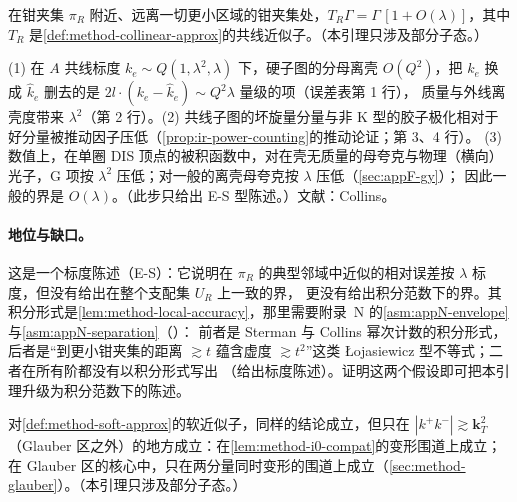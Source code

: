 \begin{lemma}\label{lem:method-collinear-accuracy}
在钳夹集 $\pi_R$ 附近、远离一切更小区域的钳夹集处，$T_R\Gamma=\Gamma\,[1+O(\lambda)]$，其中 $T_R$ 是\cref{def:method-collinear-approx}的共线近似子。（本引理只涉及部分子态。）
\end{lemma}

\begin{proofsketch}
(1) 在 $A$ 共线标度 $k_e\sim Q(1,\lambda^2,\lambda)$ 下，硬子图的分母离壳 $O(Q^2)$，把 $k_e$ 换成 $\hat k_e$ 删去的是 $2l\cdot(k_e-\hat k_e)\sim Q^2\lambda$ 量级的项（误差表第 1 行），
质量与外线离壳度带来 $\lambda^2$（第 2 行）。(2) 共线子图的坏旋量分量与非 K 型的胶子极化相对于好分量被推动因子压低（\cref{prop:ir-power-counting}的推动论证；第 3、4 行）。
(3) 数值上，在单圈 DIS 顶点的被积函数中，对在壳无质量的母夸克与物理（横向）光子，G 项按 $\lambda^2$ 压低；对一般的离壳母夸克按 $\lambda$ 压低（\cref{sec:appF-gy}）；
因此一般的界是 $O(\lambda)$。（此步只给出 E-S 型陈述。）文献：Collins\cite[第~10~章（Sudakov 形状因子）与第~11.3~节]{Collins2011}。
\end{proofsketch}

\paragraph{地位与缺口。}这是一个标度陈述（E-S）：它说明在 $\pi_R$ 的典型邻域中近似的相对误差按 $\lambda$ 标度，但没有给出在整个支配集 $U_R$ 上一致的界，
更没有给出积分范数下的界。其积分形式是\cref{lem:method-local-accuracy}，那里需要附录~N 的\cref{asm:appN-envelope}与\cref{asm:appN-separation}（\tagA）：
前者是 Sterman 与 Collins 幂次计数的积分形式，后者是“到更小钳夹集的距离 $\gtrsim t$ 蕴含虚度 $\gtrsim t^2$”这类 Łojasiewicz 型不等式；二者在所有阶都没有以积分形式写出
（\cite[第~5~章]{Collins2011}给出标度陈述）。证明这两个假设即可把本引理升级为积分范数下的陈述。

\begin{lemma}\label{lem:method-soft-accuracy}
对\cref{def:method-soft-approx}的软近似子，同样的结论成立，但只在 $|k^+k^-|\gtrsim\mathbf k_T^2$（Glauber 区之外）的地方成立：在\cref{lem:method-i0-compat}的变形围道上成立；
在 Glauber 区的核心中，只在两分量同时变形的围道上成立（\cref{sec:method-glauber}）。（本引理只涉及部分子态。）
\end{lemma}

